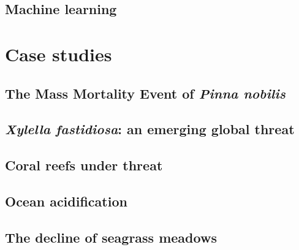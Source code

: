 \subsection{\label{sec:Machine learning} Machine learning}

\section{\label{sec:Case studies} Case studies}

\subsection{\label{sec:The Mass Mortality Event of Pinna nobilis} The Mass
  Mortality Event of \textit{Pinna nobilis}}

\subsection{\label{sec:Xylella fastidiosa: an emerging global
    threat}\textit{Xylella
    fastidiosa}: an emerging global threat}

\subsection{\label{sec:Coral reefs under threat} Coral reefs under threat}

\subsection{\label{sec:Ocean acidification} Ocean acidification}

\subsection{\label{sec:The decline of seagrass meadows} The decline of seagrass
  meadows}




